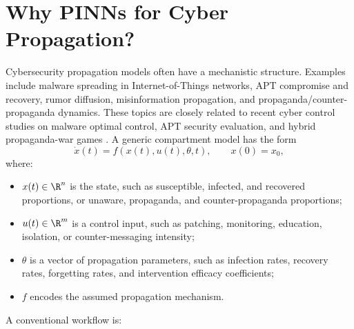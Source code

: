 \documentclass[11pt,a4paper]{article}
\begin{document}
\section{Why PINNs for Cyber Propagation?}

Cybersecurity propagation models often have a mechanistic structure. Examples include malware spreading in Internet-of-Things networks, APT compromise and recovery, rumor diffusion, misinformation propagation, and propaganda/counter-propaganda dynamics. These topics are closely related to recent cyber control studies on malware optimal control, APT security evaluation, and hybrid propaganda-war games \cite{jafar2024malware,yang2019apt,cheng2024hodge}. A generic compartment model has the form
\begin{equation}
    \dot{x}(t)=f(x(t),u(t),\theta,t), \qquad x(0)=x_0,
    \label{eq:generic_ode}
\end{equation}
where:
\begin{itemize}[leftmargin=2em]
    \item $x(t)\in\R^n$ is the state, such as susceptible, infected, and recovered proportions, or unaware, propaganda, and counter-propaganda proportions;
    \item $u(t)\in\R^m$ is a control input, such as patching, monitoring, education, isolation, or counter-messaging intensity;
    \item $\theta$ is a vector of propagation parameters, such as infection rates, recovery rates, forgetting rates, and intervention efficacy coefficients;
    \item $f$ encodes the assumed propagation mechanism.
\end{itemize}

A conventional workflow is:
\begin{center}
\end{center}
\end{document}
